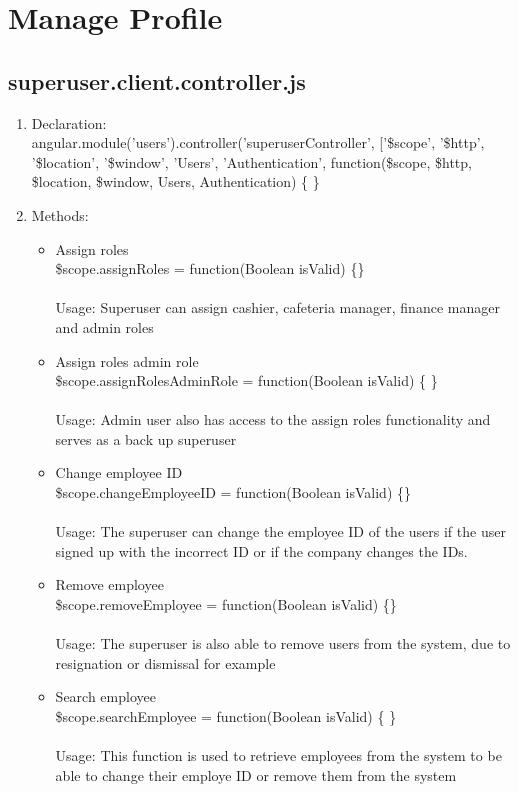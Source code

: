 \documentclass[a4paper,12pt]{article}
\begin{document}
\section{Manage Profile}
\subsection{superuser.client.controller.js}
\begin{enumerate}
\item Declaration: \\ angular.module('users').controller('superuserController', ['\$scope', '\$http', '\$location', '\$window', 'Users', 'Authentication',
	function(\$scope, \$http, \$location, \$window, Users, Authentication) \{ \}
\item Methods: 
	\begin{itemize}
		\item Assign roles \\ \$scope.assignRoles = function(Boolean isValid) \{\} \\ \\
		Usage: Superuser can assign cashier, cafeteria manager, finance manager and admin roles
		\item Assign roles admin role \\ \$scope.assignRolesAdminRole = function(Boolean isValid) \{ \} \\ \\
		Usage: Admin user also has access to the assign roles functionality and serves as a back up superuser
		\item Change employee ID \\ \$scope.changeEmployeeID = function(Boolean isValid) \{\} \\ \\
		Usage: The superuser can change the employee ID of the users if the user signed up with the incorrect ID or if the company changes the IDs.
		\item Remove employee \\ \$scope.removeEmployee = function(Boolean isValid) \{\}
		\\ \\ Usage: The superuser is also able to remove users from the system, due to resignation or dismissal for example
		\item Search employee \\ \$scope.searchEmployee = function(Boolean isValid) \{ \}
		\\ \\ Usage: This function is used to retrieve employees from the system to be able to change their employe ID or remove them from the system

\end{itemize}
\end{enumerate}
\end{document}
